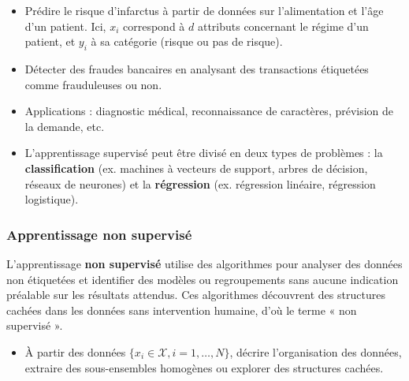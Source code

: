 \documentclass[a4paper,14pt]{article}
\begin{document}
        
        \begin{itemize}
            \item  Prédire le risque d’infarctus à partir de données sur l’alimentation et l’âge d’un patient. Ici, \(x_i\) correspond à \(d\) attributs concernant le régime d’un patient, et \(y_i\) à sa catégorie (risque ou pas de risque).
            \item  Détecter des fraudes bancaires en analysant des transactions étiquetées comme frauduleuses ou non.
            \item  Applications : diagnostic médical, reconnaissance de caractères, prévision de la demande, etc.
        \end{itemize}
        
        
        \begin{itemize}
            \item L'apprentissage supervisé peut être divisé en deux types de problèmes : la \textbf{classification} (ex. machines à vecteurs de support, arbres de décision, réseaux de neurones) et la \textbf{régression} (ex. régression linéaire, régression logistique).
        \end{itemize}
        
        \subsubsection{Apprentissage non supervisé}
        
        L'apprentissage \textbf{non supervisé} utilise des algorithmes pour analyser des données non étiquetées et identifier des modèles ou regroupements sans aucune indication préalable sur les résultats attendus. Ces algorithmes découvrent des structures cachées dans les données sans intervention humaine, d'où le terme « non supervisé ».
        
        
        \begin{itemize}
            \item  À partir des données \(\{x_i \in \mathcal{X}, i = 1, \ldots, N\}\), décrire l’organisation des données, extraire des sous-ensembles homogènes ou explorer des structures cachées.
        \end{itemize}
        
        
\end{document}
